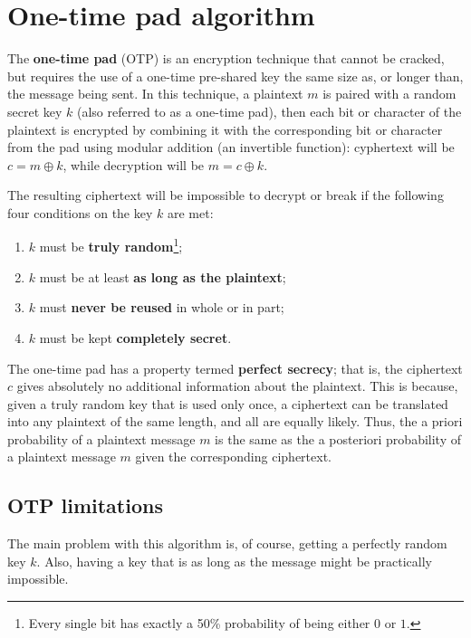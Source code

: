 
\section{One-time pad algorithm}
The \textbf{one-time pad} (OTP) is an encryption technique that cannot be cracked, but requires the use of a one-time pre-shared key the same size as, or longer than, the message being sent. In this technique, a plaintext $m$ is paired with a random secret key $k$ (also referred to as a one-time pad), then each bit or character of the plaintext is encrypted by combining it with the corresponding bit or character from the pad using modular addition (an invertible function): cyphertext will be $c=m\oplus k$, while decryption will be $m=c\oplus k$.

The resulting ciphertext will be impossible to decrypt or break if the following four conditions on the key $k$ are met:

\begin{enumerate}
    \item $k$ must be \textbf{truly random}\footnote{Every single bit has exactly a 50\% probability of being either $0$ or $1$.};
    \item $k$ must be at least \textbf{as long as the plaintext};
    \item $k$ must \textbf{never be reused} in whole or in part;
    \item $k$ must be kept \textbf{completely secret}.
\end{enumerate}

The one-time pad has a property termed \textbf{perfect secrecy}; that is, the ciphertext $c$ gives absolutely no additional information about the plaintext. This is because, given a truly random key that is used only once, a ciphertext can be translated into any plaintext of the same length, and all are equally likely. Thus, the a priori probability of a plaintext message $m$ is the same as the a posteriori probability of a plaintext message $m$ given the corresponding ciphertext.


\subsection*{OTP limitations}

The main problem with this algorithm is, of course, getting a perfectly random key $k$. Also, having a key that is as long as the message might be practically impossible.

